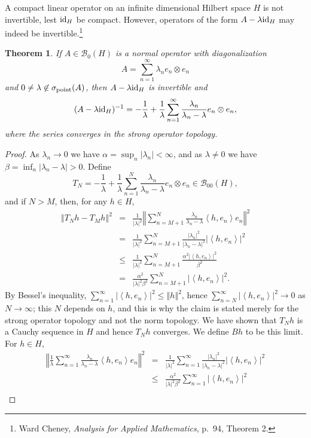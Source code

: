 \documentclass{article}
\newcommand{\inner}[2]{\left\langle #1, #2 \right\rangle}
\newcommand{\id}{\ensuremath\mathrm{id}}
\newcommand{\point}{\ensuremath\sigma_{\mathrm{point}}}
\newcommand{\norm}[1]{\left\Vert #1 \right\Vert}
\newtheorem{theorem}{Theorem}
\theoremstyle{definition}
\begin{document}
A compact linear operator on an infinite dimensional Hilbert space $H$ is not invertible, lest $\id_H$ 
be compact. However, operators of the form $A-\lambda \id_H$ may indeed be invertible.\footnote{Ward
Cheney, {\em Analysis for Applied Mathematics}, p.~94, Theorem 2.}

\begin{theorem}
If $A \in \mathscr{B}_0(H)$ is a normal operator with diagonalization
\[
A=\sum_{n=1}^\infty \lambda_n e_n \otimes e_n
\]
and $0 \neq \lambda \not \in \point(A)$, 
 then $A-\lambda \id_H$ is invertible and
\[
(A-\lambda \id_H)^{-1} = -\frac{1}{\lambda}+\frac{1}{\lambda} \sum_{n=1}^\infty \frac{\lambda_n}{\lambda_n-\lambda} e_n \otimes e_n,
\]
where the series converges in the strong operator topology.
\end{theorem}
\begin{proof}
As $\lambda_n \to 0$ we have $\alpha = \sup_n |\lambda_n|<\infty$, and as $\lambda \neq 0$ we have $\beta=\inf_n |\lambda_n-\lambda|>0$.
Define
\[
T_N =-\frac{1}{\lambda}+\frac{1}{\lambda} \sum_{n=1}^N \frac{\lambda_n}{\lambda_n-\lambda} e_n \otimes e_n \in \mathscr{B}_{00}(H),
\]
and if $N>M$, then, for any $h \in H$,
\begin{eqnarray*}
\norm{T_Nh-T_Mh}^2 &=&\frac{1}{|\lambda|^2} \norm{\sum_{n=M+1}^N  \frac{\lambda_n}{\lambda_n-\lambda} \inner{h}{e_n}e_n}^2\\
&=&\frac{1}{|\lambda|^2} \sum_{n=M+1}^N  \frac{|\lambda_n|^2}{|\lambda_n-\lambda|^2} |\inner{h}{e_n}|^2\\
&\leq&\frac{1}{|\lambda|^2} \sum_{n=M+1}^N \frac{\alpha^2 |\inner{h}{e_n}|^2}{\beta^2}\\
&=&\frac{\alpha^2}{|\lambda|^2 \beta^2} \sum_{n=M+1}^N |\inner{h}{e_n}|^2.
\end{eqnarray*}
By Bessel's inequality, $\sum_{n=1}^\infty |\inner{h}{e_n}|^2 \leq \norm{h}^2$, hence $\sum_{n=N}^\infty |\inner{h}{e_n}|^2 \to 0$ as $N \to \infty$; this $N$ depends on $h$,
and this is why the claim is stated merely for the strong operator topology and not the norm topology. We have shown that $T_N h$ is a Cauchy sequence in $H$ and hence
$T_N h$ converges. We define $Bh$ to be this limit. 
For $h \in H$,
\begin{eqnarray*}
\norm{\frac{1}{\lambda} \sum_{n=1}^\infty \frac{\lambda_n}{\lambda_n-\lambda} \inner{h}{e_n}e_n}^2&=&\frac{1}{|\lambda|^2} \sum_{n=1}^\infty \frac{|\lambda_n|^2}{|\lambda_n-\lambda|^2} |\inner{h}{e_n}|^2\\
&\leq&\frac{\alpha^2}{|\lambda|^2 \beta^2} \sum_{n=1}^\infty |\inner{h}{e_n}|^2\\

\end{eqnarray*}
\end{proof}
\end{document}
